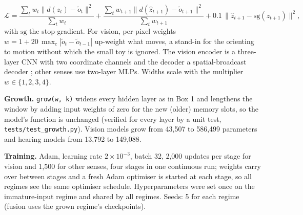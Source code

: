 \documentclass{article}
\begin{document}
\begin{equation}\mathcal L=\frac{\sum_t w_t\lVert d(z_t)-\tilde o_t\rVert^2}{\sum_t w_t}+\frac{\sum_t w_{t+1}\lVert d(\hat z_{t+1})-\tilde o_{t+1}\rVert^2}{\sum_t w_{t+1}}+0.1\,\lVert\hat z_{t+1}-\mathrm{sg}(z_{t+1})\rVert^2,\end{equation}
with \(\mathrm{sg}\) the stop-gradient. For vision, per-pixel weights \(w=1+20\,\max_c|\tilde o_t-\tilde o_{t-1}|\) up-weight what moves, a stand-in for the orienting to motion without which the small toy is ignored. The vision encoder is a three-layer CNN with two coordinate channels and the decoder a spatial-broadcast decoder \autocite{watters2019spatial}; other senses use two-layer MLPs. Widths scale with the multiplier \(w\in\{1,2,3,4\}\).

\textbf{Growth.} \texttt{grow(w\textquotesingle{},\ k\textquotesingle{})} widens every hidden layer as in Box 1 and lengthens the window by adding input weights of zero for the new (older) memory slots, so the model's function is unchanged (verified for every layer by a unit test, \texttt{tests/test\_growth.py}). Vision models grow from 43,507 to 586,499 parameters and hearing models from 13,792 to 149,088.

\textbf{Training.} Adam, learning rate \(2\times10^{-3}\), batch 32, 2,000 updates per stage for vision and 1,500 for other senses, four stages in one continuous run; weights carry over between stages and a fresh Adam optimiser is started at each stage, so all regimes see the same optimiser schedule. Hyperparameters were set once on the immature-input regime and shared by all regimes. Seeds: 5 for each regime (fusion uses the grown regime's checkpoints).
\end{document}
